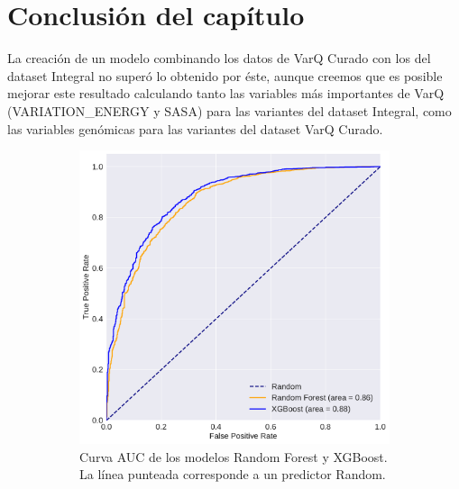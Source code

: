 \section{Conclusión del capítulo}

La creación de un modelo combinando los datos de VarQ Curado con los del dataset Integral no superó lo obtenido por éste, aunque creemos que es posible mejorar este resultado calculando tanto las variables más importantes de VarQ (VARIATION\_ENERGY y SASA) para las variantes del dataset Integral, como las variables genómicas para las variantes del dataset VarQ Curado. 

\newpage
\begin{figure}[H]
\centering
\begin{subfigure}[b]{0.7\textwidth}
    \centering
    \includegraphics[width=\textwidth]{documents/latex/figures/3/integral_varq/auc_varq_integral.pdf}
    \caption{Curva AUC de los modelos Random Forest y XGBoost. La línea punteada corresponde a un predictor Random.}
    \label{fig:auc_integral_varq}
\end{subfigure}
\hfill
\hfill
\begin{subfigure}[b]{0.7\textwidth}
    \centering

\end{subfigure}
\end{figure}
